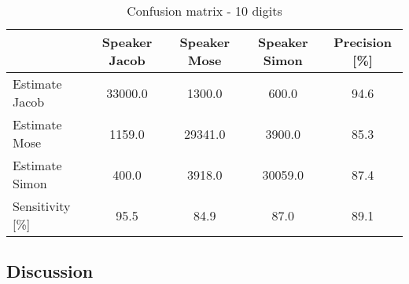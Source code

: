 \begin{table}[H]                          
\centering                                                     
\begin{tabular}{|l|c|c|c|c|}                                   
\hline                                                         
  & Speaker Jacob & Speaker Mose & Speaker Simon & Precision [\%] \\
\hline                                                         
Estimate Jacob & 33000.0 & 1300.0 & 600.0 & 94.6 \\            
\hline                                                         
Estimate Mose & 1159.0 & 29341.0 & 3900.0 & 85.3 \\            
\hline                                                         
Estimate Simon & 400.0 & 3918.0 & 30059.0 & 87.4 \\            
\hline                                                         
Sensitivity [\%] & 95.5 & 84.9 & 87.0 & 89.1 \\                
\hline                                                         
\end{tabular}                                                  
\caption{Confusion matrix - 10 digits}                         
\label{table:GMM_conf_10}                                      
\end{table}

\subsection{Discussion}














